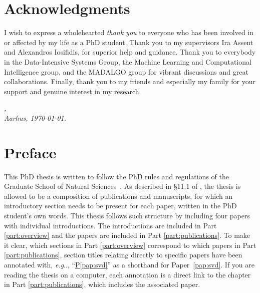 \documentclass[11pt,a4paper,twoside,openright,final]{memoir}
\makeatletter
\DeclareRobustCommand\onedot{\futurelet\@let@token\@onedot}
\def\@onedot{\ifx\@let@token.\else.\null\fi\xspace}
\def\eg{\emph{e.g}\onedot} \def\Eg{\emph{E.g}\onedot}
\newcommand\contribution[1]{\hspace{0.5em}\hyperref[#1]{P\ref{#1}}}
\newcommand*{\paperref}[1]{Paper~\hyperref[#1]{\ref{#1}}}
\makeatother
\begin{document}
\cleardoublepage
\chapter*{{\Huge Acknowledgments}}

I wish to express a wholehearted \emph{thank you} to everyone who has been involved in or affected by my life as a PhD student.
Thank you to my supervisors Ira Assent and Alexandros Iosifidis, for superior help and guidance.
Thank you to everybody in the Data-Intensive Systems Group, the Machine Learning and Computational Intelligence group, and the MADALGO group for vibrant discussions and great collaborations. 
Finally, thank you to my friends and especially my family for your support and genuine interest in my research. 

\vspace{2ex}
\begin{flushright}
  \makeatletter\emph{\theauthor,}\makeatother\\
  \emph{Aarhus, \today.}
\end{flushright}

\cleardoublepage
\chapter*{{\Huge Preface}}
This PhD thesis is written to follow the PhD rules and regulations of the Graduate School of Natural Sciences~\cite{au-regulations}. 
As described in \S 11.1 of \cite{au-regulations}, the thesis is allowed to be a composition of publications and manuscripts, for which an introductory section needs to be present for each paper, written in the PhD student's own words.
This thesis follows such structure by including four papers with individual introductions.
The introductions are included in Part \ref{part:overview} and the papers are included in Part \ref{part:publications}.
To make it clear, which sections in Part \ref{part:overview} correspond to which papers in Part \ref{part:publications}, section titles relating directly to specific papers have been annotated with, \eg,  ``\hspace{-0.5em}\contribution{pap:svd}'' as a shorthand for \paperref{pap:svd}.
If you are reading the thesis on a computer, each annotation is a direct link to the chapter in Part \ref{part:publications}, which includes the associated paper.
\end{document}
